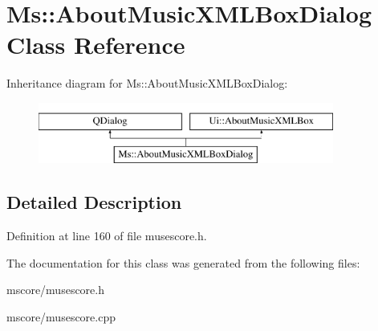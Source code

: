 \hypertarget{class_ms_1_1_about_music_x_m_l_box_dialog}{}\section{Ms\+:\+:About\+Music\+X\+M\+L\+Box\+Dialog Class Reference}
\label{class_ms_1_1_about_music_x_m_l_box_dialog}
Inheritance diagram for Ms\+:\+:About\+Music\+X\+M\+L\+Box\+Dialog\+:\begin{figure}[H]
\begin{center}
\leavevmode
\includegraphics[height=2.000000cm]{class_ms_1_1_about_music_x_m_l_box_dialog}
\end{center}
\end{figure}


\subsection{Detailed Description}


Definition at line 160 of file musescore.\+h.



The documentation for this class was generated from the following files\+:\begin{DoxyCompactItemize}
\item 
mscore/musescore.\+h\item 
mscore/musescore.\+cpp\end{DoxyCompactItemize}
